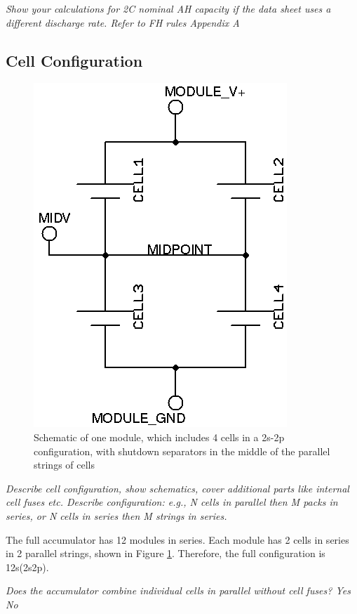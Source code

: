\documentclass{article}
\begin{document}
        \textit{Show your calculations for 2C nominal AH capacity if the data sheet uses a different discharge rate. Refer to FH rules Appendix A}

    \subsection{Cell Configuration}

            \begin{figure}[H]
                \centering
                \includegraphics{moduleschem}
                \caption{Schematic of one module, which includes 4 cells in a 2s-2p configuration, with shutdown separators in the middle of the parallel strings of cells}
                \label{moduleschem}
            \end{figure}

        \textit{Describe cell configuration, show schematics, cover additional parts like internal cell fuses etc. Describe configuration: e.g., N cells in parallel then M packs in series, or N cells in series then M strings in series.}

        The full accumulator has 12 modules in series. Each module has 2 cells in series in 2 parallel strings, shown in Figure \ref{moduleschem}. Therefore, the full configuration is 12s(2s2p).

        \textit{Does the accumulator combine individual cells in parallel without cell fuses? \makebox[0pt][l]{$\square$}\raisebox{.15ex}{\hspace{0.1em}$\checkmark$} \hspace{0.2cm} Yes
        \makebox[0pt][l]{$\square$}\raisebox{.15ex}{\hspace{0.1em}} \hspace{0.2cm} No}
\end{document}
